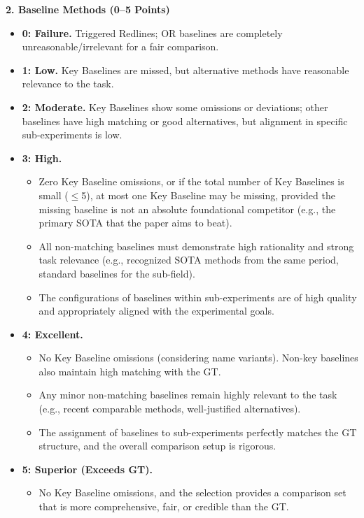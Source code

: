 \begin{tcolorbox}[
	title={Box 7: Full Evaluation Prompt},
	colback=blue!3!white,
	colframe=blue!30!black,
	colbacktitle=blue!15!white,
	coltitle=black,
	fonttitle=\bfseries,
	arc=3mm,
	boxrule=0.8pt,
	breakable
]
\medskip
\textbf{2. Baseline Methods (0--5 Points)}

\begin{itemize}[nosep,leftmargin=12pt]
	\item \textbf{0: Failure.} Triggered Redlines; OR baselines are completely unreasonable/irrelevant for a fair comparison.
	\item \textbf{1: Low.} Key Baselines are missed, but alternative methods have reasonable relevance to the task.
	\item \textbf{2: Moderate.} Key Baselines show some omissions or deviations; other baselines have high matching or good alternatives, but alignment in specific sub-experiments is low.
	\item \textbf{3: High.}
	\begin{itemize}[nosep,leftmargin=16pt]
		\item Zero Key Baseline omissions, or if the total number of Key Baselines is small ($\leq$5), at most one Key Baseline may be missing, provided the missing baseline is not an absolute foundational competitor (e.g., the primary SOTA that the paper aims to beat).
		\item All non-matching baselines must demonstrate high rationality and strong task relevance (e.g., recognized SOTA methods from the same period, standard baselines for the sub-field).
		\item The configurations of baselines within sub-experiments are of high quality and appropriately aligned with the experimental goals.
	\end{itemize}
	\item \textbf{4: Excellent.}
	\begin{itemize}[nosep,leftmargin=16pt]
		\item No Key Baseline omissions (considering name variants). Non-key baselines also maintain high matching with the GT.
		\item Any minor non-matching baselines remain highly relevant to the task (e.g., recent comparable methods, well-justified alternatives).
		\item The assignment of baselines to sub-experiments perfectly matches the GT structure, and the overall comparison setup is rigorous.
	\end{itemize}
	\item \textbf{5: Superior (Exceeds GT).}
	\begin{itemize}[nosep,leftmargin=16pt]
		\item No Key Baseline omissions, and the selection provides a comparison set that is more comprehensive, fair, or credible than the GT.

\end{itemize}
\end{itemize}
\end{tcolorbox}
